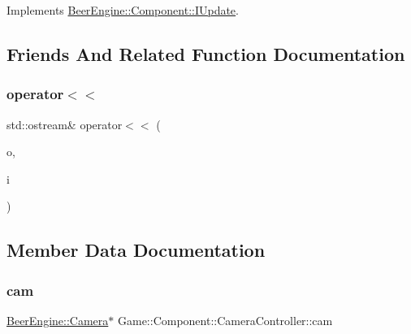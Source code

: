 Implements \mbox{\hyperlink{class_beer_engine_1_1_component_1_1_i_update_aeeda0aa303175720e449b4c51d9867dd}{Beer\+Engine\+::\+Component\+::\+I\+Update}}.



\subsection{Friends And Related Function Documentation}
\mbox{\label{class_game_1_1_component_1_1_camera_controller_a5746cb5b8916dd3839a38b83018ae1ac}} 
\subsubsection{\texorpdfstring{operator$<$$<$}{operator<<}}
{\footnotesize\ttfamily std\+::ostream\& operator$<$$<$ (\begin{DoxyParamCaption}\item[{std\+::ostream \&}]{o,  }\item[{\mbox{\hyperlink{class_game_1_1_component_1_1_camera_controller}{Camera\+Controller}} const \&}]{i }\end{DoxyParamCaption})\hspace{0.3cm}{\ttfamily [friend]}}



\subsection{Member Data Documentation}
\mbox{\label{class_game_1_1_component_1_1_camera_controller_a5e619d2b8d42b5b55e743392bdd18ebd}} 
\subsubsection{\texorpdfstring{cam}{cam}}
{\footnotesize\ttfamily \mbox{\hyperlink{class_beer_engine_1_1_camera}{Beer\+Engine\+::\+Camera}}$\ast$ Game\+::\+Component\+::\+Camera\+Controller\+::cam}

